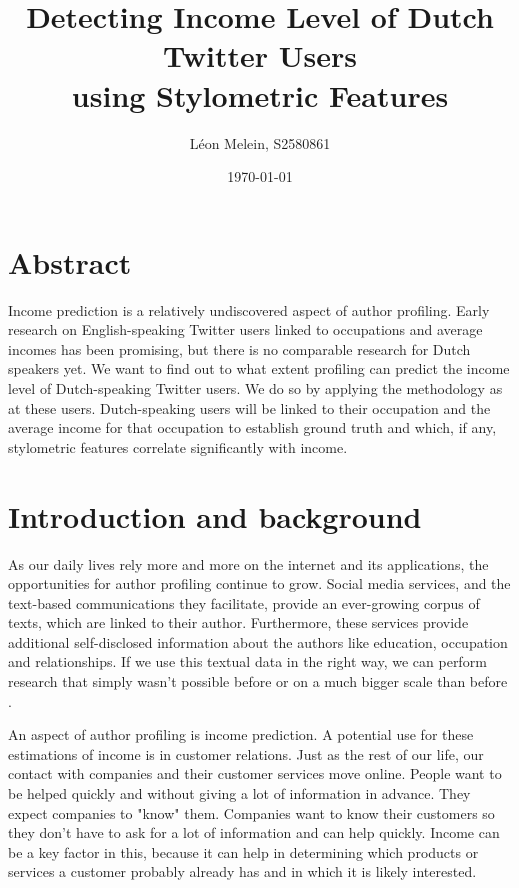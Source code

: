 \documentclass[11pt, a4paper]{article}
\begin{document}
\title{Detecting Income Level of Dutch Twitter Users\\using Stylometric Features}
\author{L\'eon Melein, S2580861}
\date{\today}
\maketitle
\section*{Abstract}
Income prediction is a relatively undiscovered aspect of author profiling. Early research on English-speaking Twitter users linked to occupations and average incomes has been promising, but there is no comparable research for Dutch speakers yet. We want to find out to what extent profiling can predict the income level of Dutch-speaking Twitter users. We do so by applying the methodology as \citet{flekova} at these users. Dutch-speaking users will be linked to their occupation and the average income for that occupation to establish ground truth and which, if any, stylometric features correlate significantly with income.

\newpage
\section{Introduction and background}
As our daily lives rely more and more on the internet and its applications, the opportunities for author profiling continue to grow. Social media services, and the text-based communications they facilitate, provide an ever-growing corpus of texts, which are linked to their author. Furthermore, these services provide additional self-disclosed information about the authors like education, occupation and relationships. If we use this textual data in the right way, we can perform research that simply wasn't possible before or on a much bigger scale than before \citep{sloan}.

An aspect of author profiling is income prediction. A potential use for these estimations of income is in customer relations. Just as the rest of our life, our contact with companies and their customer services move online. People want to be helped quickly and without giving a lot of information in advance. They expect companies to "know" them. Companies want to know their customers so they don't have to ask for a lot of information and can help quickly. Income can be a key factor in this, because it can help in determining which products or services a customer probably already has and in which it is likely interested.
\end{document}
